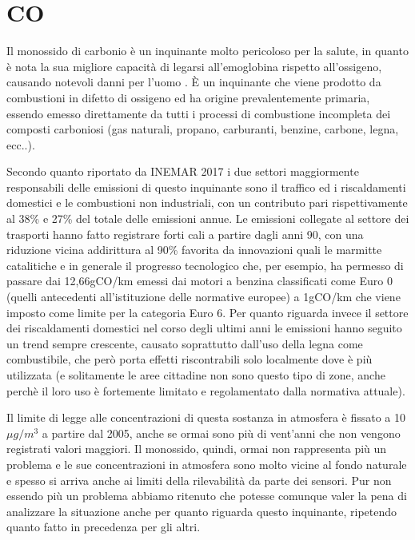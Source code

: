\documentclass[a4paper]{report}
\begin{document}
\section{CO}
Il monossido di carbonio è un inquinante molto pericoloso per la salute, in quanto è nota la sua migliore capacità di legarsi all'emoglobina rispetto all'ossigeno, causando notevoli danni per l'uomo \cite{kao2005carbon}.
È un inquinante che viene prodotto da combustioni in difetto di ossigeno ed ha origine prevalentemente primaria, essendo emesso direttamente da tutti i processi di combustione incompleta dei composti carboniosi (gas naturali, propano, carburanti, benzine, carbone, legna, ecc..).

Secondo quanto riportato da INEMAR 2017 i due settori maggiormente responsabili delle emissioni di questo inquinante sono il traffico ed i riscaldamenti domestici e le combustioni non industriali, con un contributo pari rispettivamente al 38\% e 27\% del totale delle emissioni annue. Le emissioni collegate al settore dei trasporti hanno fatto registrare forti cali a partire dagli anni 90, con una riduzione vicina addirittura al 90\% favorita da innovazioni quali le marmitte catalitiche e in generale il progresso tecnologico che, per esempio, ha permesso di passare dai 12,66gCO/km emessi dai motori a benzina classificati come Euro 0 (quelli antecedenti all'istituzione delle normative europee) a 1gCO/km che viene imposto come limite per la categoria Euro 6.
Per quanto riguarda invece il settore dei riscaldamenti domestici nel corso degli ultimi anni le emissioni hanno seguito un trend sempre crescente, causato soprattutto dall'uso della legna come combustibile, che però porta effetti riscontrabili solo localmente dove è più utilizzata (e solitamente le aree cittadine non sono questo tipo di zone, anche perchè il loro uso è fortemente limitato e regolamentato dalla normativa attuale).

Il limite di legge alle concentrazioni di questa sostanza in atmosfera è fissato a 10 $\mu g/m^3$ a partire dal 2005, anche se ormai sono più di vent'anni che non vengono registrati valori maggiori. Il monossido, quindi, ormai non rappresenta più un problema e le sue concentrazioni in atmosfera sono molto vicine al fondo naturale \cite{arpa2018rapporto}
 e spesso si arriva anche ai limiti della rilevabilità da parte dei sensori.
Pur non essendo più un problema abbiamo ritenuto che potesse comunque valer la pena di analizzare la situazione anche per quanto riguarda questo inquinante, ripetendo quanto fatto in precedenza per gli altri.
\end{document}
